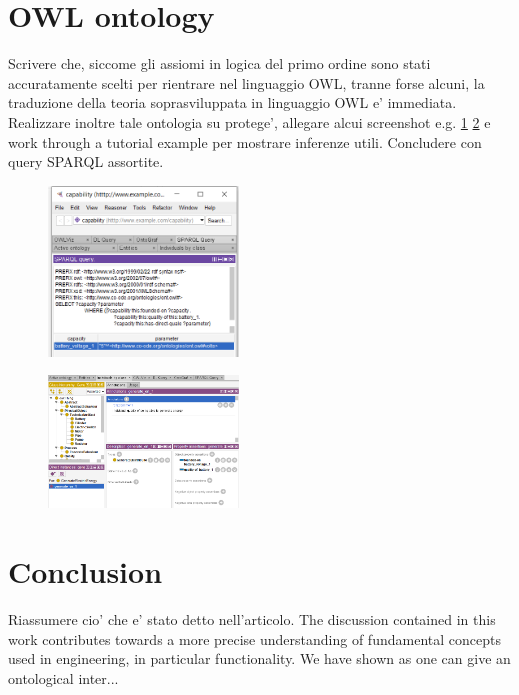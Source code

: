 \documentclass[sw]{iosart2x}
\newcommand{\TODO}[1]{{\color{red} #1}}
\newcommand{\TODOinline}[1]{{\color{red} #1}}
\begin{document}
\section{\TODOinline{OWL ontology}}\label{sec:appendice}
\TODO{Scrivere che, siccome gli assiomi in logica del primo ordine sono stati accuratamente scelti per rientrare nel linguaggio OWL, tranne forse alcuni, la traduzione della teoria soprasviluppata in linguaggio OWL e' immediata. 
Realizzare inoltre tale ontologia su protege', allegare alcui screenshot e.g. \ref{fig:screen_query} \ref{fig:screen_entities} e work through a tutorial example per mostrare inferenze utili. Concludere con query SPARQL assortite.}
\begin{figure}
  \centering
  \includegraphics[width=0.45\textwidth]{query_screenshot.PNG}
  \caption{\label{fig:screen_query}}
\end{figure}

\begin{figure}
  \centering
  \includegraphics[width=0.45\textwidth]{entities_screenshot.PNG}
  \caption{\label{fig:screen_entities}}
\end{figure}

\section{Conclusion}\label{sec:conc}
\TODO{Riassumere cio' che e' stato detto nell'articolo.} %
\TODO{The discussion contained in this work contributes towards a more precise understanding of fundamental concepts used in engineering, in particular functionality.
We have shown as one can give an ontological inter...}
\end{document}
